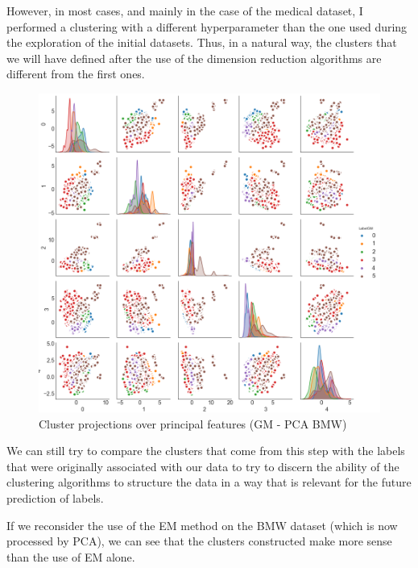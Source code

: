 \documentclass[15pt]{article}
\begin{document}
\begin{multicols}{2}
However, in most cases, and mainly in the case of the medical dataset, I performed a clustering with a different hyperparameter than the one used during the exploration of the initial datasets. Thus, in a natural way, the clusters that we will have defined after the use of the dimension reduction algorithms are different from the first ones.

\begin{figure}[H]
\centering
\includegraphics[width = \columnwidth]{pplotBMWgmpca.png}
\caption{Cluster projections over principal features (GM - PCA BMW)}
\end{figure}

We can still try to compare the clusters that come from this step with the labels that were originally associated with our data to try to discern the ability of the clustering algorithms to structure the data in a way that is relevant for the future prediction of labels.

If we reconsider the use of the EM method on the BMW dataset (which is now processed by PCA), we can see that the clusters constructed make more sense than the use of EM alone.




\end{multicols}
\end{document}
